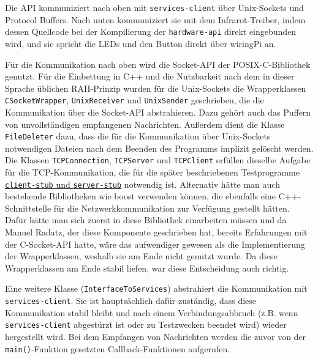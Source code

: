 Die API kommuniziert nach oben mit \texttt{services-client} über Unix-Sockets und Protocol Buffers.
Nach unten kommuniziert sie mit dem Infrarot-Treiber, indem dessen Quellcode bei der Kompilierung
der \texttt{hardware-api} direkt eingebunden wird, und sie spricht die LEDs und den Button direkt
über wiringPi an.

Für die Kommunikation nach oben wird die Socket-API der POSIX-C-Bibliothek genutzt.
Für die Einbettung in C++ und die Nutzbarkeit nach dem in dieser Sprache üblichen RAII-Prinzip
wurden für die Unix-Sockets die Wrapperklassen \texttt{CSocketWrapper}, \texttt{UnixReceiver} und
\texttt{UnixSender} geschrieben, die die Kommunikation über die Socket-API abstrahieren.
Dazu gehört auch das Puffern von unvollständigen empfangenen Nachrichten.
Außerdem dient die Klasse \texttt{FileDeleter} dazu, dass die für die Kommunikation über
Unix-Sockets notwendigen Dateien nach dem Beenden des Programms implizit gelöscht werden.
Die Klassen \texttt{TCPConnection}, \texttt{TCPServer} und \texttt{TCPClient} erfüllen dieselbe
Aufgabe für die TCP-Kommunikation, die für die später beschriebenen Testprogramme
\hyperref[client-stub-und-server-stub]{\texttt{client-stub} und \texttt{server-stub}} notwendig ist.
Alternativ hätte man auch bestehende Bibliotheken wie boost verwenden können, die ebenfalls eine
C++-Schnittstelle für die Netzwerkkommunikation zur Verfügung gestellt hätten.
Dafür hätte man sich zuerst in diese Bibliothek einarbeiten müssen und da Manuel Radatz, der diese
Komponente geschrieben hat, bereits Erfahrungen mit der C-Socket-API hatte, wäre das aufwendiger
gewesen als die Implementierung der Wrapperklassen, weshalb sie am Ende nicht genutzt wurde.
Da diese Wrapperklassen am Ende stabil liefen, war diese Entscheidung auch richtig.

Eine weitere Klasse (\texttt{InterfaceToServices}) abstrahiert die Kommunikation mit
\texttt{services-client}.
Sie ist hauptsächlich dafür zuständig, dass diese Kommunikation stabil bleibt und nach einem
Verbindungsabbruch (z.B. wenn \texttt{services-client} abgestürzt ist oder zu Testzwecken beendet
wird) wieder hergestellt wird.
Bei dem Empfangen von Nachrichten werden die zuvor von der \texttt{main()}-Funktion gesetzten
Callback-Funktionen aufgerufen.

